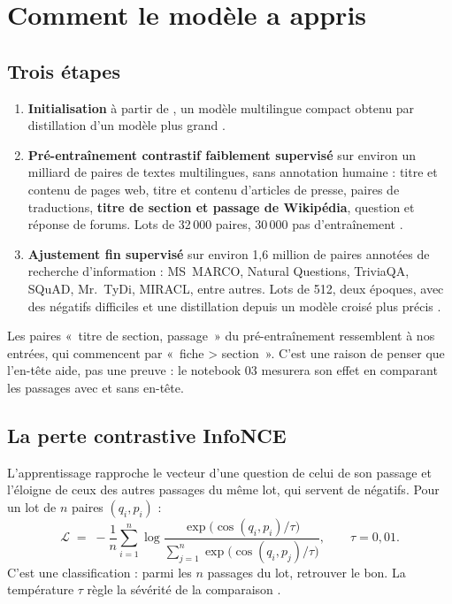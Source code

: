 \section{Comment le modèle a appris}

\subsection{Trois étapes}

\begin{enumerate}
\item \textbf{Initialisation} à partir de , un modèle multilingue
  compact obtenu par distillation d'un modèle plus grand \source.
\item \textbf{Pré-entraînement contrastif faiblement supervisé} sur environ un milliard de paires de textes
  multilingues, sans annotation humaine : titre et contenu de pages web, titre et contenu d'articles de presse,
  paires de traductions, \textbf{titre de section et passage de Wikipédia}, question et réponse de forums. Lots de
  32\,000 paires, 30\,000 pas d'entraînement \source.
\item \textbf{Ajustement fin supervisé} sur environ 1,6 million de paires annotées de recherche d'information :
  MS~MARCO, Natural Questions, TriviaQA, SQuAD, Mr.~TyDi, MIRACL, entre autres. Lots de 512, deux époques, avec des
  négatifs difficiles et une distillation depuis un modèle croisé plus précis \source.
\end{enumerate}

Les paires «~titre de section, passage~» du pré-entraînement ressemblent à nos entrées, qui commencent par
«~fiche > section~». C'est une raison de penser que l'en-tête aide, pas une preuve : le notebook 03 mesurera
son effet en comparant les passages avec et sans en-tête.

\subsection{La perte contrastive InfoNCE}

L'apprentissage rapproche le vecteur d'une question de celui de son passage et l'éloigne de ceux des autres passages
du même lot, qui servent de négatifs. Pour un lot de $n$ paires $(q_i, p_i)$ :
\[
  \mathcal{L} \;=\; -\frac{1}{n}\sum_{i=1}^{n}
  \log \frac{\exp\big(\cos(q_i,p_i)/\tau\big)}{\sum_{j=1}^{n}\exp\big(\cos(q_i,p_j)/\tau\big)},
  \qquad \tau = 0{,}01 .
\]
C'est une classification : parmi les $n$ passages du lot, retrouver le bon. La température $\tau$ règle la sévérité
de la comparaison \source.


